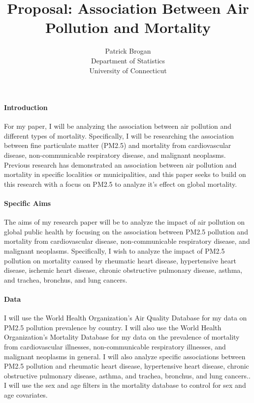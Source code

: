 \documentclass[12pt]{article}\usepackage[]{graphicx}\usepackage[]{xcolor}
\title{Proposal: Association Between Air Pollution and Mortality}
\author{Patrick Brogan\\
  Department of Statistics\\
  University of Connecticut
}
\begin{document}
\maketitle


\paragraph{Introduction}
For my paper, I will be analyzing the association between air pollution and different types of mortality. Specifically, I will be researching the association between fine particulate matter (PM2.5) and mortality from cardiovascular disease, non-communicable respiratory disease, and malignant neoplasms. Previous research has demonstrated an association between air pollution and mortality in specific localities or municipalities\citep{dockery1993association}\citep{sunyer1996air}\citep{jerrett2005spatial}, and this paper seeks to build on this research with a focus on PM2.5 to analyze it's effect on global mortality.

\paragraph{Specific Aims}
The aims of my research paper will be to analyze the impact of air pollution on global public health by focusing on the association between PM2.5 pollution and mortality from cardiovascular disease, non-communicable respiratory disease, and malignant neoplasms. Specifically, I wish to analyze the impact of PM2.5 pollution on mortality caused by rheumatic heart disease, hypertensive heart disease, ischemic heart disease, chronic obstructive pulmonary disease, asthma, and trachea, bronchus, and lung cancers.

\paragraph{Data}
I will use the World Health Organization's Air Quality Database for my data on PM2.5 pollution prevalence by country.\citep{world health organization_2022} I will also use the World Health Organization's Mortality Database for my data on the prevalence of mortality from cardiovascular illnesses, non-communicable respiratory illnesses, and malignant neoplasms in general. I will also analyze specific associations between PM2.5 pollution and rheumatic heart disease, hypertensive heart disease,  chronic obstructive pulmonary disease, asthma, and trachea, bronchus, and lung cancers..\citep{world health organization_2022} I will use the sex and age filters in the mortality database to control for sex and age covariates.
\end{document}
